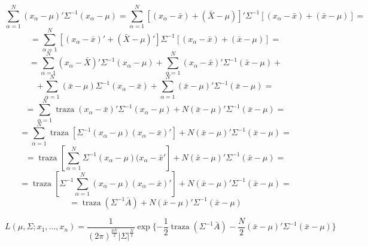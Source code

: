 \documentclass[11pt,a4paper]{article}
\begin{document}
\begin{itemize}
$$\sum_{\alpha=1}^{N} (x_{\alpha}-\mu)' \Sigma^{-1} (x_{\alpha}-\mu) = \sum_{\alpha=1}^{N}[(x_{\alpha}-\bar{x}) + (\bar{X}-\mu)]' \Sigma^{-1} [(x_{\alpha}-\bar{x}) + (\bar{x} - \mu)] =$$
$$= \sum_{\alpha=1}^{N} [(x_{\alpha} - \bar{x})' + (\bar{X}-\mu)'] \Sigma^{-1} [(x_{\alpha} - \bar{x}) + (\bar{x} - \mu)] =$$
$$= \sum_{\alpha=1}^{N} (x_{\alpha} - \bar{X})' \Sigma^{-1} (x_{\alpha} - \mu) + \sum_{\alpha=1}^{N}(x_{\alpha}-\bar{x})' \Sigma^{-1}(\bar{x}-\mu) +$$
$$+ \sum_{\alpha=1}^{N} (\bar{x}-\mu) \Sigma^{-1} (x_{\alpha} - \bar{x}) + \sum_{\alpha=1}^{N} (\bar{x}-\mu)' \Sigma^{-1} (\bar{x}-\mu) =$$
$$= \sum_{\alpha=1}^{N} \operatorname{traza}(x_{\alpha} - \bar{x})' \Sigma^{-1} (x_{\alpha} - \mu) + N(\bar{x}-\mu)' \Sigma^{-1} (\bar{x}-\mu) =$$
$$= \sum_{\alpha=1}^{N} \operatorname{traza} [\Sigma^{-1}(x_{\alpha} - \mu)(x_{\alpha} - \bar{x})'] + N(\bar{x} - \mu)' \Sigma^{-1} (\bar{x}-\mu) =$$
$$= \operatorname{traza}[\sum_{\alpha=1}^{N} \Sigma^{-1}(x_{\alpha} - \mu) (x_{\alpha} - \bar{x}'] + N(\bar{x} - \mu)' \Sigma^{-1} (\bar{x}-\mu) =$$
$$= \operatorname{traza}[\Sigma^{-1} \sum_{\alpha=1}^{N} (x_{\alpha} - \mu)(x_{\alpha} - \bar{x})'] + N(\bar{x}-\mu)' \Sigma^{-1} (\bar{x}-\mu) =$$
$$= \operatorname{traza}(\Sigma^{-1}\bar{A}) + N(\bar{x}-\mu)' \Sigma^{-1} (\bar{x}-\mu)$$

$$L(\mu, \Sigma; x_{1}, \dots, x_{n}) = \frac{1}{(2\pi)^{\frac{pN}{2}}|\Sigma|^{\frac{N}{2}}} \operatorname{exp}\{-\frac{1}{2} \operatorname{traza}(\Sigma^{-1}\bar{A}) - \frac{N}{2}(\bar{x}-\mu)' \Sigma^{-1} (\bar{x}-\mu)\}$$
 
\end{itemize}
\end{document}
